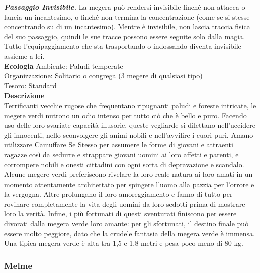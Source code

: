 \begin{multicols}{2}
\emph{\textbf{Passaggio Invisibile.}} La megera può rendersi invisibile finché non attacca o lancia un incantesimo, o finché non termina la concentrazione (come se si stesse concentrando su di un incantesimo). Mentre è invisibile, non lascia traccia fisica del suo passaggio, quindi le sue tracce possono essere seguite solo dalla magia. Tutto l'equipaggiamento che sta trasportando o  indossando diventa invisibile assieme a lei.\\
\textbf{Ecologia}
Ambiente: Paludi temperate\\
Organizzazione: Solitario o congrega (3 megere di qualsiasi tipo)\\
Tesoro: Standard\\
\textbf{Descrizione}\\
Terrificanti vecchie rugose che frequentano ripugnanti paludi e foreste intricate, le megere verdi nutrono un odio intenso per tutto ciò che è bello e puro. Facendo uso delle loro svariate capacità illusorie, queste vegliarde si dilettano nell'uccidere gli innocenti, nello sconvolgere gli animi nobili e nell'avvilire i cuori puri. Amano utilizzare Camuffare Se Stesso per assumere le forme di giovani e attraenti ragazze così da sedurre e strappare giovani uomini ai loro affetti e parenti, e corrompere nobili e onesti cittadini con ogni sorta di depravazione e scandalo. Alcune megere verdi preferiscono rivelare la loro reale natura ai loro amati in un momento attentamente architettato per spingere l’uomo alla pazzia per l’orrore e la vergogna. Altre prolungano il loro amoreggiamento e fanno di tutto per rovinare completamente la vita degli uomini da loro sedotti prima di mostrare loro la verità. Infine, i più fortunati di questi sventurati finiscono per essere divorati dalla megera verde loro amante: per gli sfortunati, il destino finale può essere molto peggiore, dato che la crudele fantasia della megera verde è immensa. Una tipica megera verde è alta tra 1,5 e 1,8 metri e pesa poco meno di 80 kg.\\

\subsubsection{Melme}


\end{multicols}

